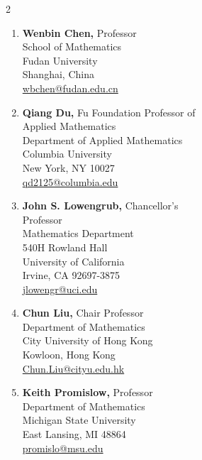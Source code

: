 \documentclass[10pt,letterpaper]{article}
\begin{document}
	\begin{multicols}{2}

	
	
	\begin{enumerate}
	\item
\textbf{Wenbin Chen,} Professor
	\\
School of Mathematics
	\\
Fudan University
	\\
Shanghai, China
	\\
\href{mailto:wbchen@fudan.edu.cn}{wbchen@fudan.edu.cn}
	
	\item	
\textbf{Qiang Du,} Fu Foundation Professor of 
	\\
\hspace*{0.25in} Applied Mathematics
	\\
Department of Applied Mathematics
	\\
Columbia University
	\\
New York, NY 10027
	\\
\href{mailto:qd2125@columbia.edu}{qd2125@columbia.edu}

	\item
\textbf{John S. Lowengrub,} Chancellor's 
	\\
\hspace*{0.25in} Professor
	\\
Mathematics Department
 	\\
540H Rowland Hall
	\\
University of California
	\\
Irvine, CA 92697-3875
	\\
\href{mailto:jlowengr@uci.edu}{jlowengr@uci.edu}

	\item
\textbf{Chun Liu,} Chair Professor
	\\
Department of Mathematics
	\\
City University of Hong Kong
	\\
Kowloon, Hong Kong
	\\
\href{mailto:Chun.Liu@cityu.edu.hk}{Chun.Liu@cityu.edu.hk}
	
	\columnbreak
	
	\item
\textbf{Keith Promislow,} Professor
	\\
Department of Mathematics
	\\
Michigan State University
	\\
East Lansing, MI 48864
	\\
\href{mailto:promislo@msu.edu}{promislo@msu.edu}
	

\end{enumerate}
\end{multicols}
\end{document}
